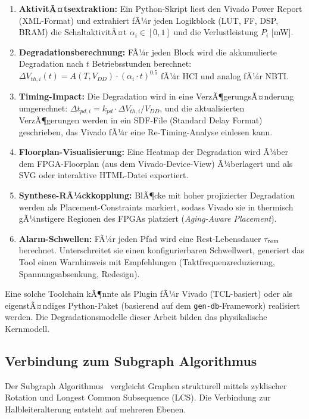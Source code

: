 ﻿\documentclass[a4paper,12pt]{article}
\theoremstyle{definition}
\begin{document}
\begin{enumerate}
	\item \textbf{AktivitÃ¤tsextraktion:} Ein Python-Skript liest den Vivado
	      Power Report (XML-Format) und extrahiert fÃ¼r jeden Logikblock
	      (LUT, FF, DSP, BRAM) die SchaltaktivitÃ¤t $\alpha_i \in [0,1]$
	      und die Verlustleistung $P_i$ [mW].
	\item \textbf{Degradationsberechnung:} FÃ¼r jeden Block wird die
	      akkumulierte Degradation nach $t$ Betriebsstunden berechnet:
	      $\Delta V_{th,i}(t) = A(T, V_{DD}) \cdot (\alpha_i \cdot t)^{0.5}$
	      fÃ¼r HCI und analog fÃ¼r NBTI.
	\item \textbf{Timing-Impact:} Die Degradation wird in eine VerzÃ¶gerungsÃ¤nderung
	      umgerechnet: $\Delta t_{pd,i} = k_{pd} \cdot \Delta V_{th,i} / V_{DD}$,
	      und die aktualisierten VerzÃ¶gerungen werden in ein SDF-File (Standard
	      Delay Format) geschrieben, das Vivado fÃ¼r eine Re-Timing-Analyse einlesen kann.
	\item \textbf{Floorplan-Visualisierung:} Eine Heatmap der Degradation wird
	      Ã¼ber dem FPGA-Floorplan (aus dem Vivado-Device-View) Ã¼berlagert und als
	      SVG oder interaktive HTML-Datei exportiert.
	\item \textbf{Synthese-RÃ¼ckkopplung:} BlÃ¶cke mit hoher projizierter Degradation
	      werden als Placement-Constraints markiert, sodass Vivado sie in thermisch
	      gÃ¼nstigere Regionen des FPGAs platziert (\emph{Aging-Aware Placement}).
	\item \textbf{Alarm-Schwellen:} FÃ¼r jeden Pfad wird eine Rest-Lebensdauer
	      $\tau_{\rm rem}$ berechnet. Unterschreitet sie einen konfigurierbaren
	      Schwellwert, generiert das Tool einen Warnhinweis mit Empfehlungen
	      (Taktfrequenzreduzierung, Spannungsabsenkung, Redesign).
\end{enumerate}

Eine solche Toolchain kÃ¶nnte als Plugin fÃ¼r Vivado (TCL-basiert) oder als
eigenstÃ¤ndiges Python-Paket (basierend auf dem \texttt{gen-db}-Framework)
realisiert werden. Die Degradationsmodelle dieser Arbeit bilden das
physikalische Kernmodell.

\subsection{Verbindung zum Subgraph Algorithmus}
\label{sub:subgraph}

Der Subgraph Algorithmus~\cite{epp2026} vergleicht Graphen strukturell mittels
zyklischer Rotation und Longest Common Subsequence (LCS). Die Verbindung zur
Halbleiteralterung entsteht auf mehreren Ebenen.
\end{document}

